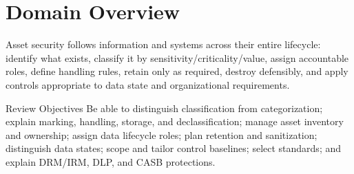 \documentclass[10pt,letterpaper]{article}
\title{\CornellDocumentTitle}
\author{Arthur Deane and Aaron Kraus}
\date{\today}
\begin{document}
\maketitle

\section*{Domain Overview}
Asset security follows information and systems across their entire lifecycle: identify what exists, classify it by sensitivity/criticality/value, assign accountable roles, define handling rules, retain only as required, destroy defensibly, and apply controls appropriate to data state and organizational requirements.

\begin{summarybox}{Review Objectives}
Be able to distinguish classification from categorization; explain marking, handling, storage, and declassification; manage asset inventory and ownership; assign data lifecycle roles; plan retention and sanitization; distinguish data states; scope and tailor control baselines; select standards; and explain DRM/IRM, DLP, and CASB protections.
\end{summarybox}
\end{document}
